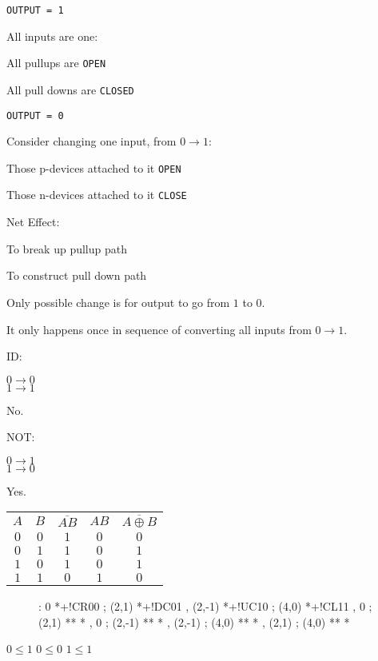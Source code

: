 \documentclass[a4paper,12pt]{article}
\begin{document}
\verb!OUTPUT = 1!

All inputs are one:

All pullups are \verb!OPEN!

All pull downs are \verb!CLOSED!

\verb!OUTPUT = 0!

Consider changing one input, from $0 \to 1$:

Those p-devices attached to it \verb!OPEN!

Those n-devices attached to it \verb!CLOSE!

Net Effect:

To break up pullup path

To construct pull down path

Only possible change is for output to go from $1$ to $0$.

It only happens once in sequence of converting all inputs from $0 \to
1$.

ID:

$0 \to 0$ \\
$1 \to 1$

No.

NOT:

$0 \to 1$\\
$1 \to 0$

Yes.

\begin{tabular}{ccccc}
$A$	&	$B$	&	$\overline{AB}$	&	$AB$	&	$\overline{A \oplus B}$	\\
$0$	&	$0$	&	$1$					&	$0$	&	$0$						\\
$0$	&	$1$	&	$1$					&	$0$	&	$1$						\\
$1$	&	$0$	&	$1$					&	$0$	&	$1$						\\
$1$	&	$1$	&	$0$					&	$1$	&	$0$						\\
\end{tabular}

\begin{figure}[h]

\xy <1cm,0cm>:
0 *+!CR{00} ; (2,1) *+!DC{01} ,
(2,-1) *+!UC{10} ; (4,0) *+!CL{11} ,
0 ; (2,1) ** *\dir{>} ,
0 ; (2,-1) ** *\dir{>} , 
(2,-1) ; (4,0) ** *\dir{>} ,
(2,1) ; (4,0) ** *\dir{>}
\endxy

\end{figure}

\vspace{10mm}

$0 \leq 1$ \hspace{20mm} $0 \leq 0$ \hspace{20mm} $1 \leq 1$
\end{document}
